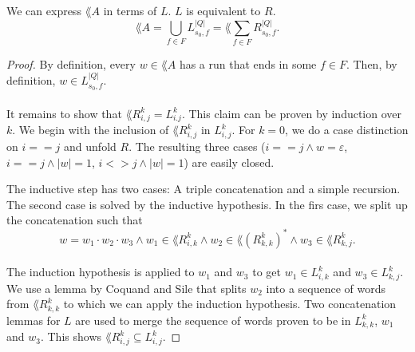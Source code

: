\documentclass[11pt,a4paper,oneside]{book}
\begin{document}
                    \begin{theorem} We can express $\lang{A}$ in terms of $L$. $L$ is equivalent to $R$.
                        \label{LR}
                        \[
                             \lang{A} = \bigcup\limits_{f \in F} L^{|Q|}_{s_0, f} = \lang{\sum\limits_{f \in F} R^{|Q|}_{s_0, f}}.
                        \]
                    \end{theorem}

                    \begin{proof}
                        By definition, every $w \in \lang{A}$ has a run that ends in some $f \in F$. 
                        Then, by definition, $w \in  L^{|Q|}_{s_0, f}$. 

                    \paragraph{}
                        It remains to show that $\lang{R^k_{i,j}} = L^k_{i.j}$. 
                        This claim can be proven by induction over $k$. 
                        We begin with the inclusion of $\lang{R^k_{i,j}}$ in $L^k_{i,j}$. 
                        For $k=0$, we do a case distinction on $i==j$ and unfold $R$. 
                        The resulting three cases ($i==j \wedge w=\varepsilon$, $i==j \wedge |w|=1$, $i<>j \wedge |w|=1$) are easily closed. 

                        The inductive step has two cases: A triple concatenation and a simple recursion. 
                        The second case is solved by the inductive hypothesis.
                        In the firs case, we split up the concatenation such that
                        \[
                            w = w_1 \cdot w_2 \cdot w_3 
                            \wedge w_1 \in \lang{R^k_{i,k}} 
                            \wedge w_2 \in \lang{(R^k_{k,k})^*} 
                            \wedge w_3 \in \lang{R^k_{k,j}}.
                        \]
                    \paragraph{}
                        The induction hypothesis is applied to $w_1$ and $w_3$ to get $w_1 \in L^k_{i,k}$ and $w_3 \in L^k_{k,j}$.
                        We use a lemma by Coquand and Sile that splits $w_2$ into a sequence of words from $\lang{R^k_{k,k}}$ to which we can apply the induction hypothesis. 
                        Two concatenation lemmas for $L$ are used to merge the sequence of words proven to be in $L^k_{k,k}$,
                        $w_1$ and $w_3$. This shows $\lang{R^k_{i,j}} \subseteq L^k_{i,j}$.


\end{proof}
\end{document}
